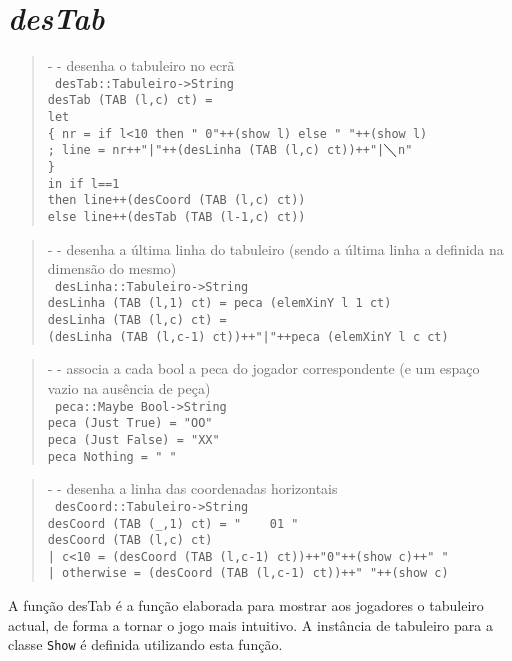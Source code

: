 \documentclass[a4paper,titlepage]{scrreprt}
\begin{document}
	\section{{\it desTab}}
		\begin{quote}
			{\small - - desenha o tabuleiro no ecrã\\}
			{\tt
			desTab::Tabuleiro->String\\
			desTab (TAB (l,c) ct) =\\
			let\\
			\{	nr	= if l<10 then " 0"++(show l) else " "++(show l)\\
			;	line = nr++"|"++(desLinha (TAB (l,c) ct))++"|$\diagdown$n"\\
			\}\\
			in	if l==1\\
			then line++(desCoord (TAB (l,c) ct))\\
			else line++(desTab (TAB (l-1,c) ct))\\
			}
		\end{quote}
		\begin{quote}
			{\small - - desenha a última linha do tabuleiro (sendo a última linha a definida na dimensão do mesmo)\\}
			{\tt
			desLinha::Tabuleiro->String\\
			desLinha (TAB (l,1) ct) = peca (elemXinY l 1 ct)\\
			desLinha (TAB (l,c) ct) =\\
			(desLinha (TAB (l,c-1) ct))++"|"++peca (elemXinY l c ct)
			}
		\end{quote}
		\begin{quote}
			{\small - - associa a cada bool a peca do jogador correspondente (e um espaço vazio na ausência de peça)\\}
			{\tt
			peca::Maybe Bool->String\\
			peca (Just True) = "OO"\\
			peca (Just False) = "XX"\\
			peca Nothing = "  "
			}
		\end{quote}
		\begin{quote}
			{\small - - desenha a linha das coordenadas horizontais\\}
			{\tt
			desCoord::Tabuleiro->String\\
			desCoord (TAB (\_,1) ct) = "\verb+    +01 "\\
			desCoord (TAB (l,c) ct)\\
			| c<10 = (desCoord (TAB (l,c-1) ct))++"0"++(show c)++" "\\
			| otherwise = (desCoord (TAB (l,c-1) ct))++" "++(show c)
			}
		\end{quote}
	A função desTab é a função elaborada para mostrar aos jogadores o tabuleiro actual, de forma a tornar o jogo mais intuitivo.
	A instância de tabuleiro para a classe {\tt Show} é definida utilizando esta função.
\end{document}
